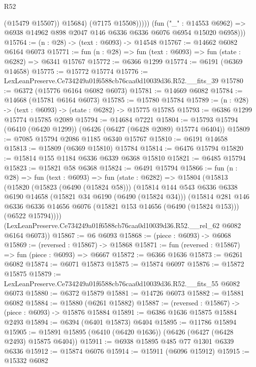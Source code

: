 \begin{lexlean}{R52}
\begin{coremodule}
                    (@15479 @15507))
                  @15684)
                (@7175 @15508)))))
        (fun ("_" : @14553 @6962) =>
        @6938 @14962 @898 @2047 @146 @6336 @6336 @6076 @6954 @15020 @6958)))
@15764 := (n : @28) -> (text : @6093) -> @14548
@15767 := @14662 @6082 @6164 @6073
@15771 := fun (n : @28) => fun (text : @6093) => fun (state : @6282) => @6341 @15767
@15772 := @6366 @1299
@15774 := @6191 (@6369 @14658)
@15775 := @15772 @15774
@15776 := LexLeanPreserve.Ce734249a01f6588cb76caa0d10039d36.R52.__fits_39
@15780 := @6372 (@15776 @6164 @6082 @6073)
@15781 := @14669 @6082
@15784 := @14668 (@15781 @6164 @6073)
@15785 := @15780 @15784
@15789 := (n : @28) -> (text : @6093) -> (state : @6282) -> @15775 @15785
@15793 := @6386 @1299 @15774 @15785 @2089
@15794 := @14684 @7221
@15804 := @15793 @15794 (@6410 (@6420 @1299)) (@6426 (@6427 (@6428 @2089) @15774 @6404))
@15809 := @7085 @15794 @2086 @1185 @6340 @15767
@15810 := @6191 @14658
@15813 := @15809 (@6369 @15810) @15784
@15814 := @6476 @15794
@15820 := @15814 @155 @1184 @6336 @6339 @6368 @15810
@15821 := @6485 @15794
@15823 := @15821 @58 @6368
@15824 := @6491 @15794
@15866 := fun (n : @28) =>
  fun (text : @6093) =>
  fun (state : @6282) =>
  @15804
    (@15813
      (@15820
        (@15823 (@6490 (@15824 @58)))
        (@15814
          @144
          @543
          @6336
          @6338
          @6190
          @14658
          (@15821 @34 @6190 (@6490 (@15824 @34)))
          (@15814
            @281
            @146
            @6336
            @6336
            @14656
            @6076
            (@15821 @153 @14656 (@6490 (@15824 @153)))
            (@6522 @15794))))
      (LexLeanPreserve.Ce734249a01f6588cb76caa0d10039d36.R52.__rel_62 @6082 @6164 @6073))
@15867 := @6 @6093
@15868 := (piece : @6093) -> @6068
@15869 := (reversed : @15867) -> @15868
@15871 := fun (reversed : @15867) => fun (piece : @6093) => @6667
@15872 := @6366 @1636
@15873 := @6261 @6082
@15874 := @6071 @15873
@15875 := @15874 @6097
@15876 := @15872 @15875
@15879 := LexLeanPreserve.Ce734249a01f6588cb76caa0d10039d36.R52.__fits_55 @6082 @6073
@15880 := @6372 @15879
@15881 := @14726 @6073
@15882 := @15881 @6082
@15884 := @15880 (@6261 @15882)
@15887 := (reversed : @15867) -> (piece : @6093) -> @15876 @15884
@15891 := @6386 @1636 @15875 @15884 @2493
@15894 := @6394 (@6401 @15873) @6404
@15895 := @11786 @15894
@15905 := @15891 @15895 (@6410 (@6420 @1636)) (@6426 (@6427 (@6428 @2493) @15875 @6404))
@15911 := @6938 @15895 @485 @77 @1301 @6339 @6336
@15912 := @15874 @6076
@15914 := @15911 (@6096 @15912)
@15915 := @15332 @6082

\end{coremodule}
\end{lexlean}
